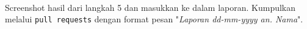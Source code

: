 \documentclass[a4paper]{tufte-handout}
\begin{document}
 \\
Screenshot hasil dari langkah 5 dan masukkan ke dalam laporan. Kumpulkan melalui {\tt pull requests} dengan format pesan "\textit{Laporan dd-mm-yyyy an. Nama}".

\hrulefill

\clearpage
\begin{comment}
\newday{\#13 - 23 Desember 2022 menggantikan 1 Desember 2022
\footnote{Mahasiswa yang hadir:
\begin{enumerate}
\item Adinda Awaliah
\item Cut Opy Mandalisa
\item Faiza Yuwafiqi
\item Jihan Dwi Sarah
\item M. Ikhsan
\item Nurani Harum Fardaniah
\item Rauzatinur Syah
\item Resha Russita
\item Rizki Ilhami
\item Salsabila Irmanda
\item Taravia Fauzah
\item Zulfahmi
\end{enumerate}}}
\end{comment}

\end{document}
